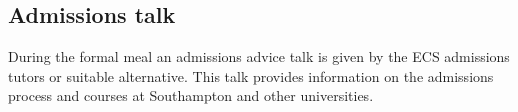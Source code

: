 
\subsection{Admissions talk}

During the formal meal an admissions advice talk is given by the ECS admissions tutors or suitable alternative.
This talk provides information on the admissions process and courses at Southampton and other universities.

